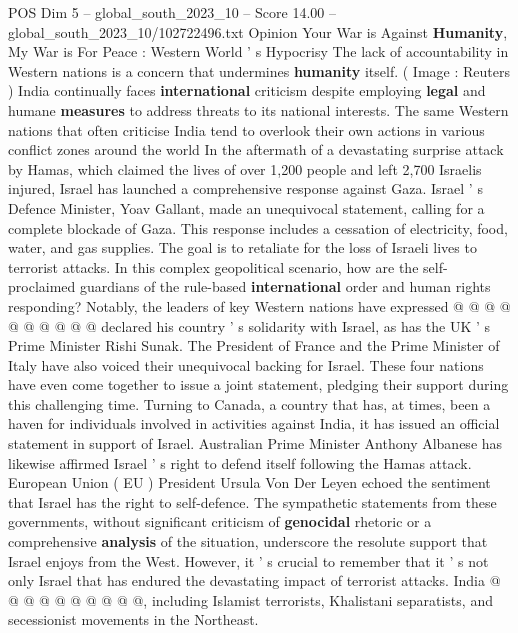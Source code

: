 \begin{textsample}{POS Dim 5 – global\_south\_2023\_10 – Score 14.00 – global\_south\_2023\_10/102722496.txt}  \label{ex:f5_pos_385}
Opinion Your War is Against \textbf{Humanity}, My War is For Peace : Western World ' s Hypocrisy The lack of accountability in Western nations is a concern that undermines \textbf{humanity} itself. ( Image : Reuters ) India continually faces \textbf{international} criticism despite employing \textbf{legal} and humane \textbf{measures} to address threats to its national interests.
The same Western nations that often criticise India tend to overlook their own actions in various conflict zones around the world In the aftermath of a devastating surprise attack by Hamas, which claimed the lives of over 1,200 people and left 2,700 Israelis injured, Israel has launched a comprehensive response against Gaza.
Israel ' s Defence Minister, Yoav Gallant, made an unequivocal statement, calling for a complete blockade of Gaza.
This response includes a cessation of electricity, food, water, and gas supplies.
The goal is to retaliate for the loss of Israeli lives to terrorist attacks.
In this complex geopolitical scenario, how are the self-proclaimed guardians of the rule-based \textbf{international} order and human rights responding?
Notably, the leaders of key Western nations have expressed @ @ @ @ @ @ @ @ @ @ declared his country ' s solidarity with Israel, as has the UK ' s Prime Minister Rishi Sunak.
The President of France and the Prime Minister of Italy have also voiced their unequivocal backing for Israel.
These four nations have even come together to issue a joint statement, pledging their support during this challenging time.
Turning to Canada, a country that has, at times, been a haven for individuals involved in activities against India, it has issued an official statement in support of Israel.
Australian Prime Minister Anthony Albanese has likewise affirmed Israel ' s right to defend itself following the Hamas attack.
European Union ( EU ) President Ursula Von Der Leyen echoed the sentiment that Israel has the right to self-defence.
The sympathetic statements from these governments, without significant criticism of \textbf{genocidal} rhetoric or a comprehensive \textbf{analysis} of the situation, underscore the resolute support that Israel enjoys from the West.
However, it ' s crucial to remember that it ' s not only Israel that has endured the devastating impact of terrorist attacks.
India @ @ @ @ @ @ @ @ @ @, including Islamist terrorists, Khalistani separatists, and secessionist movements in the Northeast.

\end{textsample}
